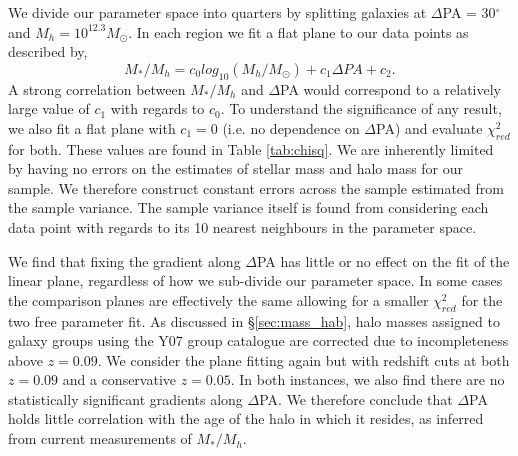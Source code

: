 We divide our parameter space into quarters by splitting galaxies at $\Delta$PA = 30$^{\circ}$ and $M_{h} = 10^{12.3}M_{\odot}$. In each region we fit a flat plane to our data points as described by,
\begin{equation}
M_{\ast}/M_{h} = c_{0} log_{10}(M_{h}/M_{\odot}) + c_{1}\Delta PA + c_{2}.
\end{equation}
A strong correlation between $M_{\ast}/M_{h}$ and $\Delta$PA would correspond to a relatively large value of $c_{1}$ with regards to $c_{0}$. To understand the significance of any result, we also fit a flat plane with $c_{1} = 0$ (i.e. no dependence on $\Delta$PA) and evaluate $\chi_{red}^2$ for both. These values are found in Table \ref{tab:chisq}. We are inherently limited by having no errors on the estimates of stellar mass and halo mass for our sample. We therefore construct constant errors across the sample estimated from the sample variance. The sample variance itself is found from considering each data point with regards to its 10 nearest neighbours in the parameter space. 

We find that fixing the gradient along $\Delta$PA has little or no effect on the fit of the linear plane, regardless of how we sub-divide our parameter space. In some cases the comparison planes are effectively the same allowing for a smaller $\chi_{red}^2$ for the two free parameter fit. As discussed in \S\ref{sec:mass_hab}, halo masses assigned to galaxy groups using the Y07 group catalogue are corrected due to incompleteness above $z=0.09$. We consider the plane fitting again but with redshift cuts at both $z=0.09$ and a conservative $z=0.05$. In both instances, we also find there are no statistically significant gradients along $\Delta$PA. We therefore conclude that $\Delta$PA holds little correlation with the age of the halo in which it resides, as inferred from current measurements of $M_{\ast}/M_{h}$. 


